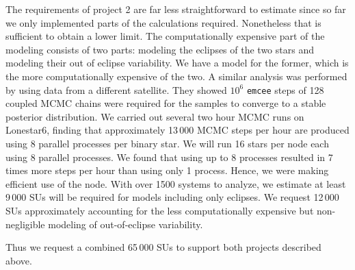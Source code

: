 \documentclass[12pt]{article}
\begin{document}
The requirements of project 2 are far less straightforward to estimate since so
far we only implemented parts of the calculations required. Nonetheless that is
sufficient to obtain a lower limit. The computationally expensive part of the
modeling consists of two parts: modeling the eclipses of the two stars and
modeling their out of eclipse variability. We have a model for the former, which
is the more computationally expensive of the two. A similar analysis was
performed by \citet{Windemuth_et_al_19} using data from a different satellite.
They showed $10^6$ \texttt{emcee} steps of 128 coupled MCMC chains were required
for the samples to converge to a stable posterior distribution. We carried out
several two hour MCMC runs on Lonestar6, finding that approximately 13\,000 MCMC
steps per hour are produced using 8 parallel processes per binary star.  We will
run 16 stars per node each using 8 parallel processes. We found that using up to
8 processes resulted in 7 times more steps per hour than using only 1 process.
Hence, we were making efficient use of the node. With over 1500 systems to
analyze, we estimate at least 9\,000 SUs will be required for models including
only eclipses. We request 12\,000 SUs approximately accounting for the less
computationally expensive but non-negligible modeling of out-of-eclipse
variability.

Thus we request a combined 65\,000 SUs to support both projects described above.

\section*{}




\end{document}
